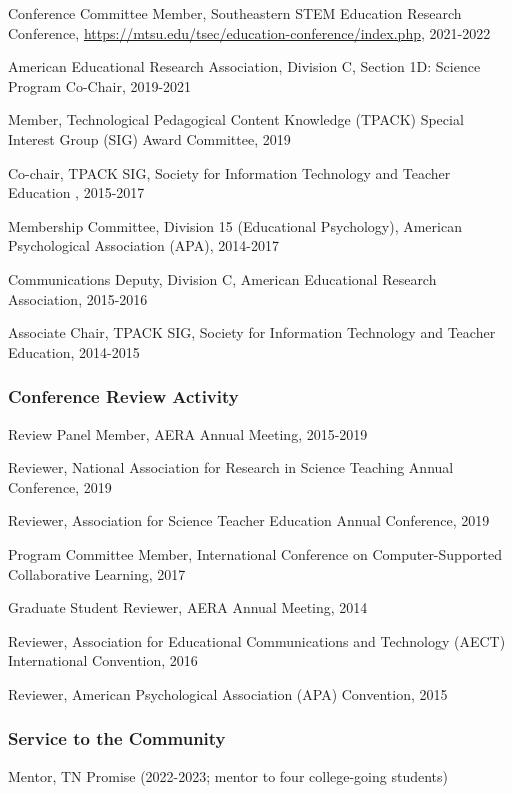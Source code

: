\documentclass[
  14,
]{article}
\begin{document}
Conference Committee Member, Southeastern STEM Education Research
Conference, \url{https://mtsu.edu/tsec/education-conference/index.php},
2021-2022

American Educational Research Association, Division C, Section 1D:
Science Program Co-Chair, 2019-2021

Member, Technological Pedagogical Content Knowledge (TPACK) Special
Interest Group (SIG) Award Committee, 2019

Co-chair, TPACK SIG, Society for Information Technology and Teacher
Education , 2015-2017

Membership Committee, Division 15 (Educational Psychology), American
Psychological Association (APA), 2014-2017

Communications Deputy, Division C, American Educational Research
Association, 2015-2016

Associate Chair, TPACK SIG, Society for Information Technology and
Teacher Education, 2014-2015

\hypertarget{conference-review-activity}{%
\subsubsection{Conference Review
Activity}\label{conference-review-activity}}

Review Panel Member, AERA Annual Meeting, 2015-2019

Reviewer, National Association for Research in Science Teaching Annual
Conference, 2019

Reviewer, Association for Science Teacher Education Annual Conference,
2019

Program Committee Member, International Conference on Computer-Supported
Collaborative Learning, 2017

Graduate Student Reviewer, AERA Annual Meeting, 2014

Reviewer, Association for Educational Communications and Technology
(AECT) International Convention, 2016

Reviewer, American Psychological Association (APA) Convention, 2015

\hypertarget{service-to-the-community}{%
\subsubsection{Service to the
Community}\label{service-to-the-community}}

Mentor, TN Promise (2022-2023; mentor to four college-going students)
\end{document}
